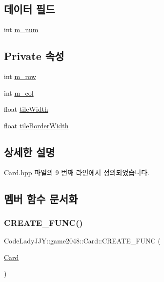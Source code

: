 \subsection*{데이터 필드}
\begin{DoxyCompactItemize}
\item 
int \hyperlink{class_code_lady_j_j_y_1_1game2048_1_1_card_ae612aaa37e50cb81d6f8ddb7283ebcbc}{m\+\_\+num}
\end{DoxyCompactItemize}
\subsection*{Private 속성}
\begin{DoxyCompactItemize}
\item 
int \hyperlink{class_code_lady_j_j_y_1_1game2048_1_1_card_a9e7a544458a7112b974db9151ed6306c}{m\+\_\+row}
\item 
int \hyperlink{class_code_lady_j_j_y_1_1game2048_1_1_card_a236bc4d61f156c7c72fd7ed0cf6cb7c7}{m\+\_\+col}
\item 
float \hyperlink{class_code_lady_j_j_y_1_1game2048_1_1_card_a42728102a89691f1449ca29afa47f713}{tile\+Width}
\item 
float \hyperlink{class_code_lady_j_j_y_1_1game2048_1_1_card_a2d91cb1451103fcc94b456bb47f4288f}{tile\+Border\+Width}
\end{DoxyCompactItemize}


\subsection{상세한 설명}


Card.\+hpp 파일의 9 번째 라인에서 정의되었습니다.



\subsection{멤버 함수 문서화}
\mbox{\label{class_code_lady_j_j_y_1_1game2048_1_1_card_aeef08b192f5d93d6852ebfb75bb9bd9a}} 
\subsubsection{\texorpdfstring{C\+R\+E\+A\+T\+E\+\_\+\+F\+U\+N\+C()}{CREATE\_FUNC()}}
{\footnotesize\ttfamily Code\+Lady\+J\+J\+Y\+::game2048\+::\+Card\+::\+C\+R\+E\+A\+T\+E\+\_\+\+F\+U\+NC (\begin{DoxyParamCaption}\item[{\hyperlink{class_code_lady_j_j_y_1_1game2048_1_1_card}{Card}}]{ }\end{DoxyParamCaption})}

